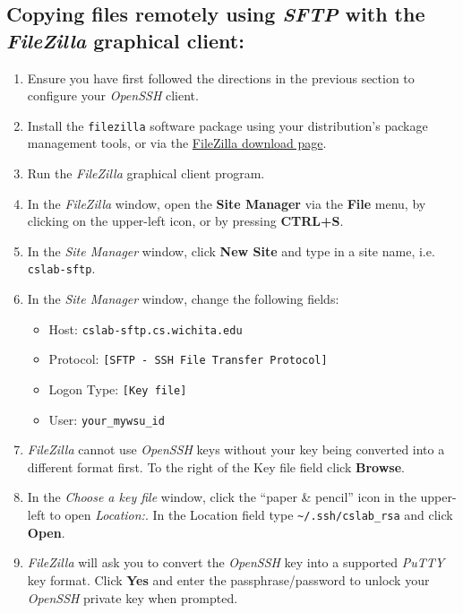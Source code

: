 \documentclass[12pt]{article}
\begin{document}
\begin{flushleft}
\subsection*{Copying files remotely using \textit{SFTP} with the \textit{FileZilla} graphical client:}
\begin{enumerate}
  \item Ensure you have first followed the directions in the previous section to configure your \textit{OpenSSH} client.
  \item Install the \texttt{filezilla} software package using your distribution's package management tools, or via the \href{https://filezilla-project.org/download.php?type=client}{FileZilla download page}.
  \item Run the \textit{FileZilla} graphical client program.
  \item In the \textit{FileZilla} window, open the \textbf{Site Manager} via the \textbf{File} menu, by clicking on the upper-left icon, or by pressing \textbf{CTRL+S}.
  \item In the \textit{Site Manager} window, click \textbf{New Site} and type in a site name, i.e. \verb|cslab-sftp|.
  \item In the \textit{Site Manager} window, change the following fields:
  \begin{itemize}
    \item Host: \verb|cslab-sftp.cs.wichita.edu|
    \item Protocol: \verb|[SFTP - SSH File Transfer Protocol]|
    \item Logon Type: \verb|[Key file]|
    \item User: \verb|your_mywsu_id|
  \end{itemize}
  \item \textit{FileZilla} cannot use \textit{OpenSSH} keys without your key being converted into a different format first. To the right of the Key file field click \textbf{Browse}.
  \item In the \textit{Choose a key file} window, click the ``paper \& pencil'' icon in the upper-left to open \textit{Location:}. In the Location field type \verb|~/.ssh/cslab_rsa| and click \textbf{Open}.
  \item \textit{FileZilla} will ask you to convert the \textit{OpenSSH} key into a supported \textit{PuTTY} key format. Click \textbf{Yes} and enter the passphrase/password to unlock your \textit{OpenSSH} private key when prompted.

\end{enumerate}
\end{flushleft}
\end{document}
